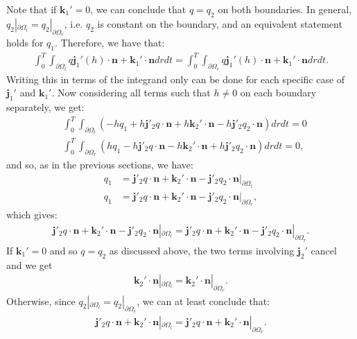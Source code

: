 \documentclass[11pt, a4paper]{article}
\theoremstyle{definition}
\newcommand{\n}{\mathbf{n}}
\newcommand{\jf}{\mathbf j}
\begin{document}
	Note that if $\mathbf{k}_1' = 0$, we can conclude that $q = q_2$ on both boundaries.
	In general, $q_2|_{\partial \Omega_l} = q_2|_{\partial \Omega_r}$, i.e. $q_2$ is constant on the boundary, and an equivalent statement holds for $q_1$. Therefore, we have that:
	\begin{align*}
		\int_0^T \int_{\partial \Omega_l}  q \jf_1'(h)   \cdot \n  +\mathbf{k}_1' \cdot \n   dr dt = \int_0^T \int_{\partial \Omega_r} q \jf_1'(h)   \cdot \n  +  \mathbf{k}_1' \cdot \n  dr dt .
	\end{align*}
	Writing this in terms of the integrand only can be done for each specific case of $\jf_1'$ and $\mathbf{k}_1'$. 
	Now considering all terms such that $h \neq 0$ on each boundary separately, we get:
	\begin{align*}
		&\int_0^T \int_{\partial \Omega_l} \left(- h q_1  + h \jf'_2 q \cdot \n + h\mathbf{k}_2' \cdot \n-  h \jf'_2 q_2 \cdot \n \right)   dr  dt =0 \\
		&\int_0^T \int_{\partial \Omega_r} \left( h q_1  - h \jf'_2 q \cdot \n - h\mathbf{k}_2' \cdot \n + h \jf'_2 q_2 \cdot \n \right)   dr  dt =0 ,
	\end{align*}
	and so, as in the previous sections, we have:
	\begin{align*}
		q_1 &=   \jf'_2 q \cdot \n + \mathbf{k}_2' \cdot \n - \jf'_2 q_2 \cdot \n |_{\partial \Omega_l} \\
		q_1 &=  \jf'_2 q \cdot \n + \mathbf{k}_2' \cdot \n -\jf'_2 q_2 \cdot \n |_{\partial \Omega_r}, 
	\end{align*}
	which gives:
	\begin{align*}
		\jf'_2 q \cdot \n +  \mathbf{k}_2' \cdot \n - \jf'_2 q_2 \cdot \n |_{\partial \Omega_l} =  \jf'_2 q \cdot \n + \mathbf{k}_2' \cdot \n - \jf'_2 q_2 \cdot \n |_{\partial \Omega_r}.
	\end{align*}
	If $\mathbf{k}_1' = 0$ and so $q = q_2$ as discussed above, the two terms involving $\jf_2'$ cancel and we get
	\begin{align*}
		\mathbf{k}_2' \cdot \n  |_{\partial \Omega_l} =   \mathbf{k}_2' \cdot \n  |_{\partial \Omega_r}.
	\end{align*}
	Otherwise, since $q_2|_{\partial \Omega_l} = q_2|_{\partial \Omega_r}$, we can at least conclude that:
	\begin{align*}
		\jf'_2 q \cdot \n + \mathbf{k}_2' \cdot \n  |_{\partial \Omega_l} =  \jf'_2 q \cdot \n + \mathbf{k}_2' \cdot \n  |_{\partial \Omega_r}.
	\end{align*}
	\\
\end{document}

